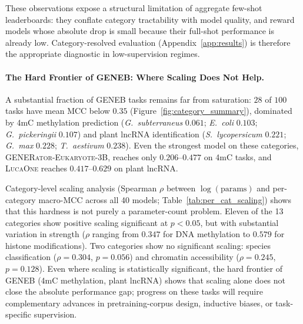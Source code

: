 \documentclass{llmxive}
\begin{document}
These observations expose a structural limitation of aggregate
few-shot leaderboards: they conflate category tractability with
model quality, and reward models whose absolute drop is small
because their full-shot performance is already low. Category-resolved
evaluation (Appendix~\ref{app:results}) is therefore the
appropriate diagnostic in low-supervision regimes.

\paragraph{The Hard Frontier of GENEB: Where Scaling Does Not Help.}
A substantial fraction of GENEB tasks remains far from saturation:
$28$ of $100$ tasks have mean MCC below $0.35$
(Figure~\ref{fig:category_summary}), dominated by 4mC methylation
prediction (\emph{G.\ subterraneus} $0.061$;
\emph{E.\ coli} $0.103$; \emph{G.\ pickeringii} $0.107$) and plant
lncRNA identification (\emph{S.\ lycopersicum} $0.221$;
\emph{G.\ max} $0.228$; \emph{T.\ aestivum} $0.238$). Even the
strongest model on these categories,
\textsc{GENERator-Eukaryote-3B}, reaches only $0.206$--$0.477$ on 4mC
tasks, and \textsc{LucaOne} reaches $0.417$--$0.629$ on plant lncRNA.

Category-level scaling analysis (Spearman $\rho$ between
$\log(\text{params})$ and per-category macro-MCC across all 40
models; Table~\ref{tab:per_cat_scaling}) shows that this hardness
is not purely a parameter-count problem. Eleven of the 13
categories show positive scaling significant at $p<0.05$, but with
substantial variation in strength ($\rho$ ranging from $0.347$ for
DNA methylation to $0.579$ for histone modifications). Two
categories show no significant scaling: species classification
($\rho=0.304$, $p=0.056$) and chromatin accessibility ($\rho=0.245$,
$p=0.128$). Even where scaling is statistically significant, the
hard frontier of GENEB (4mC methylation, plant lncRNA) shows that
scaling alone does not close the absolute performance gap; progress
on these tasks will require complementary advances in
pretraining-corpus design, inductive biases, or task-specific
supervision.
\end{document}

